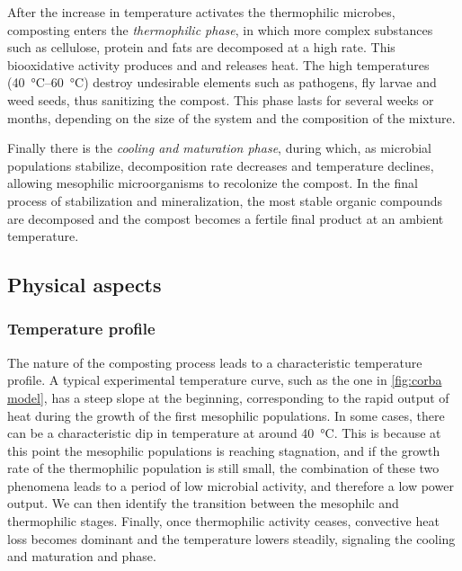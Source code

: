 \documentclass[12pt, a4paper, twocolumn, twoside]{article}
\numberwithin{table}{section}
\numberwithin{figure}{section}
\numberwithin{equation}{section}
\begin{document}
After the increase in temperature activates the thermophilic microbes, composting enters the \emph{thermophilic phase}, in which more complex substances such as cellulose, protein and fats are decomposed at a high rate. This biooxidative activity produces  and  and releases heat. The high temperatures (\SIrange{40}{60}{\celsius}) destroy undesirable elements such as pathogens, fly larvae and weed seeds, thus sanitizing the compost. This phase lasts for several weeks or months, depending on the size of the system and the composition of the mixture.

Finally there is the \emph{cooling and maturation phase}, during which, as microbial populations stabilize, decomposition rate decreases and temperature declines, allowing mesophilic microorganisms to recolonize the compost. In the final process of stabilization and mineralization, the most stable organic compounds are decomposed and the compost becomes a fertile final product at an ambient temperature.
 
\subsection{Physical aspects}
\subsubsection{Temperature profile}
The nature of the composting process leads to a characteristic temperature profile. A typical experimental temperature curve, such as the one in \cref{fig:corba model}, has a steep slope at the beginning, corresponding to the rapid output of heat during the growth of the first mesophilic populations. In some cases, there can be a characteristic dip in temperature at around \SI{40}{\celsius}. This is because at this point the mesophilic populations is reaching stagnation, and if the growth rate of the thermophilic population is still small, the combination of these two phenomena leads to a period of low microbial activity, and therefore a low power output. We can then identify the transition between the mesophilc and thermophilic stages. Finally, once thermophilic activity ceases, convective heat loss becomes dominant and the temperature lowers steadily, signaling the cooling and maturation and phase. 
\end{document}
